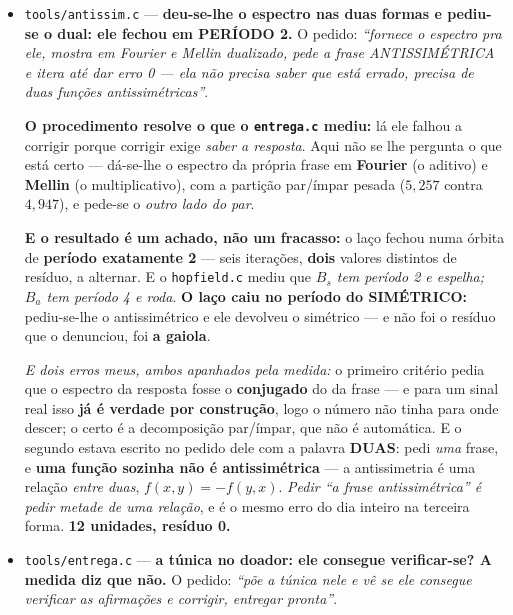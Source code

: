 \documentclass[11pt]{article}
\newcommand{\code}[1]{\texttt{\small #1}}
\theoremstyle{plain}
\theoremstyle{remark}
\begin{document}
\begin{itemize}
\textbf{E o achado, que não fui que pus lá:} ele \textbf{executou} uma involução exata enquanto
\textbf{explicava mal} o que é uma involução. A operação que fez --- aplicar duas vezes e voltar ---
\emph{é} a definição algébrica que ele não soube dizer. \emph{A estrutura estava nele; a palavra é
que não.} \textbf{8 unidades, resíduo 0.}

\item \code{tools/antissim.c} --- \textbf{deu-se-lhe o espectro nas duas formas e pediu-se o dual:
ele fechou em PERÍODO 2.} O pedido: \emph{``fornece o espectro pra ele, mostra em Fourier e Mellin
dualizado, pede a frase ANTISSIMÉTRICA e itera até dar erro 0 --- ela não precisa saber que está
errado, precisa de duas funções antissimétricas''}.

\textbf{O procedimento resolve o que o \code{entrega.c} mediu:} lá ele falhou a corrigir porque
corrigir exige \emph{saber a resposta}. Aqui não se lhe pergunta o que está certo --- dá-se-lhe o
espectro da própria frase em \textbf{Fourier} (o aditivo) e \textbf{Mellin} (o multiplicativo), com
a partição par/ímpar pesada ($5{,}257$ contra $4{,}947$), e pede-se o \emph{outro lado do par}.

\textbf{E o resultado é um achado, não um fracasso:} o laço fechou numa órbita de \textbf{período
exatamente 2} --- seis iterações, \textbf{dois} valores distintos de resíduo, a alternar. E o
\code{hopfield.c} mediu que \emph{$B_s$ tem período 2 e espelha; $B_a$ tem período 4 e roda}.
\textbf{O laço caiu no período do SIMÉTRICO:} pediu-se-lhe o antissimétrico e ele devolveu o
simétrico --- e não foi o resíduo que o denunciou, foi \textbf{a gaiola}.

\emph{E dois erros meus, ambos apanhados pela medida:} o primeiro critério pedia que o espectro da
resposta fosse o \textbf{conjugado} do da frase --- e para um sinal real isso \textbf{já é verdade
por construção}, logo o número não tinha para onde descer; o certo é a decomposição par/ímpar, que
não é automática. E o segundo estava escrito no pedido dele com a palavra \textbf{DUAS}: pedi
\emph{uma} frase, e \textbf{uma função sozinha não é antissimétrica} --- a antissimetria é uma
relação \emph{entre duas}, $f(x,y) = -f(y,x)$. \emph{Pedir ``a frase antissimétrica'' é pedir metade
de uma relação}, e é o mesmo erro do dia inteiro na terceira forma. \textbf{12 unidades, resíduo 0.}

\item \code{tools/entrega.c} --- \textbf{a túnica no doador: ele consegue verificar-se? A medida
diz que não.} O pedido: \emph{``põe a túnica nele e vê se ele consegue verificar as afirmações e
corrigir, entregar pronta''}.


\end{itemize}
\end{document}
